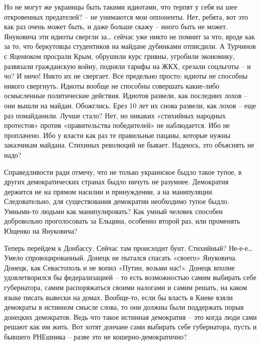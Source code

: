Но не могут же украинцы быть такими идиотами, что терпят у себя на шее
откровенных предателей? – не унимаются мои оппоненты. Нет, ребята, вот это как
раз очень может быть, и даже больше скажу – иного быть не может. Януковича эти
идиоты свергли за… сейчас уже никто не помнит за что, вроде как за то, что
беркутовцы студентиков на майдане дубинками отписдили. А Турчинов с Яценюком
просрали Крым, обрушили курс гривны, угробили экономику, развязали гражданскую
войну, подняли тарифы на ЖКХ, срезали соцльготы – и чо? И ничо! Никто их не
свергает. Все предельно просто: идиоты не способны никого свергнуть. Идиоты
вообще не способны совершать какие-либо осмысленные политические действия.
Идиотов развели, как последних лохов – они вышли на майдан. Обожглись. Ерез 10
лет их снова развели, как лохов – еще раз помайданили. Лучше стало? Нет, но
никаких «стихийных народных протестов» против «правительства победителей» не
наблюдается. Ибо не проплачено. Ибо у власти как раз те правильные пацаны,
которые нужны заказчикам майдана. Стихиных революций не бывает. Надеюсь, это
объяснять не надо?

Справедливости ради отмечу, что не только украинское быдло такое тупое, в
других демократических странах быдло ничуть не разумнее. Демократия держится не
на прямом насилии и принуждении, а на манипуляции. Следовательно, для
существования демократии необходимо тупое быдло. Умными-то людьми как
манипулировать? Как умный человек способен добровольно проголосовать за
Ельцина, особенно второй раз, или променять Ющенко на Януковича?

Теперь перейдем к Донбассу. Сейчас там происходит бунт. Стихийный? Не-е-е…
Умело спровоцированный. Донецк не пытался спасать «своего» Януковича. Донецк,
как Севастополь и не вопил «Путин, возьми нас!». Донецк вполне удовлетворился
бы федерализацией – то есть возможностью самим выбирать себе губернатора, самим
распоряжаться своими налогами и самим решать, на каком языке писать вывески на
домах. Вообще-то, если бы власть в Киеве взяли демократы в истинном смысле
слова, то они должны были поддержать порыв донецких демократов. Ведь что такое
истинная демократия – это когда люди сами решают как им жить. Вот  хотят
дончане сами выбирать себе губернатора, пусть и бывшего РНЕшника – разве это не
кошерно-демократично?


